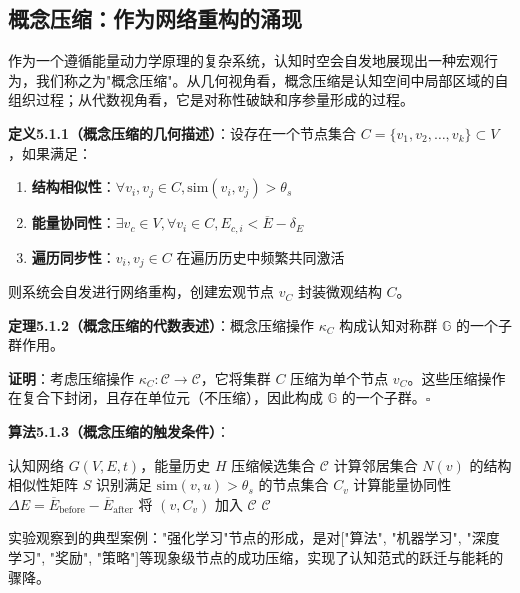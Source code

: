 \documentclass[12pt,a4paper]{article}
\newcommand{\cognitivespace}{\mathcal{C}}
\newcommand{\cognitivegroup}{\mathbb{G}}
\begin{document}
\subsection{概念压缩：作为网络重构的涌现}

作为一个遵循能量动力学原理的复杂系统，认知时空会自发地展现出一种宏观行为，我们称之为"概念压缩"。从几何视角看，概念压缩是认知空间中局部区域的自组织过程；从代数视角看，它是对称性破缺和序参量形成的过程。

\textbf{定义5.1.1（概念压缩的几何描述）}：设存在一个节点集合 $C = \{v_1, v_2, \ldots, v_k\} \subset V$，如果满足：
\begin{enumerate}
\item \textbf{结构相似性}：$\forall v_i, v_j \in C, \text{sim}(v_i, v_j) > \theta_s$
\item \textbf{能量协同性}：$\exists v_c \in V, \forall v_i \in C, E_{c,i} < \overline{E} - \delta_E$
\item \textbf{遍历同步性}：$v_i, v_j \in C$ 在遍历历史中频繁共同激活
\end{enumerate}
则系统会自发进行网络重构，创建宏观节点 $v_C$ 封装微观结构 $C$。

\textbf{定理5.1.2（概念压缩的代数表述）}：概念压缩操作 $\kappa_C$ 构成认知对称群 $\cognitivegroup$ 的一个子群作用。

\textbf{证明}：考虑压缩操作 $\kappa_C: \cognitivespace \rightarrow \cognitivespace$，它将集群 $C$ 压缩为单个节点 $v_C$。这些压缩操作在复合下封闭，且存在单位元（不压缩），因此构成 $\cognitivegroup$ 的一个子群。$\square$

\textbf{算法5.1.3（概念压缩的触发条件）}：
\begin{algorithm}
\caption{概念压缩的触发条件}
\begin{algorithmic}[1]
\Require 认知网络 $G(V,E,t)$，能量历史 $H$
\Ensure 压缩候选集合 $\mathcal{C}$
    \State 计算邻居集合 $N(v)$ 的结构相似性矩阵 $S$
    \State 识别满足 $\text{sim}(v,u) > \theta_s$ 的节点集合 $C_v$
        \State 计算能量协同性 $\Delta E = \overline{E}_{\text{before}} - \overline{E}_{\text{after}}$
            \State 将 $(v, C_v)$ 加入 $\mathcal{C}$
        \EndIf
    \EndIf
\EndFor
\State \Return $\mathcal{C}$
\end{algorithmic}
\end{algorithm}

实验观察到的典型案例："强化学习"节点的形成，是对["算法", "机器学习", "深度学习", "奖励", "策略"]等现象级节点的成功压缩，实现了认知范式的跃迁与能耗的骤降。
\end{document}
